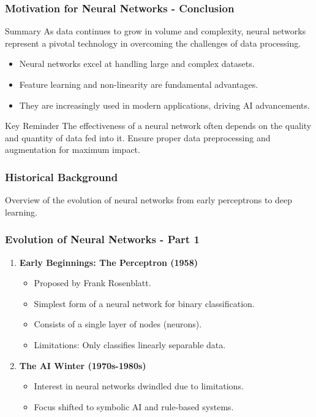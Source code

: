 \documentclass[aspectratio=169]{beamer}
\begin{document}
\begin{frame}[fragile]
    \frametitle{Motivation for Neural Networks - Conclusion}
    \begin{block}{Summary}
        As data continues to grow in volume and complexity, neural networks represent a pivotal technology in overcoming the challenges of data processing.
    \end{block}
    \begin{itemize}
        \item Neural networks excel at handling large and complex datasets.
        \item Feature learning and non-linearity are fundamental advantages.
        \item They are increasingly used in modern applications, driving AI advancements.
    \end{itemize}
    \begin{block}{Key Reminder}
        The effectiveness of a neural network often depends on the quality and quantity of data fed into it. Ensure proper data preprocessing and augmentation for maximum impact.
    \end{block}
\end{frame}

\begin{frame}[fragile]
    \frametitle{Historical Background}
    Overview of the evolution of neural networks from early perceptrons to deep learning.
\end{frame}

\begin{frame}[fragile]
    \frametitle{Evolution of Neural Networks - Part 1}
    \begin{enumerate}
        \item \textbf{Early Beginnings: The Perceptron (1958)}
        \begin{itemize}
            \item Proposed by Frank Rosenblatt.
            \item Simplest form of a neural network for binary classification.
            \item Consists of a single layer of nodes (neurons).
            \item Limitations: Only classifies linearly separable data.
        \end{itemize}
        
        \item \textbf{The AI Winter (1970s-1980s)}
        \begin{itemize}
            \item Interest in neural networks dwindled due to limitations.
            \item Focus shifted to symbolic AI and rule-based systems.
        \end{itemize}
    \end{enumerate}
\end{frame}
\end{document}
